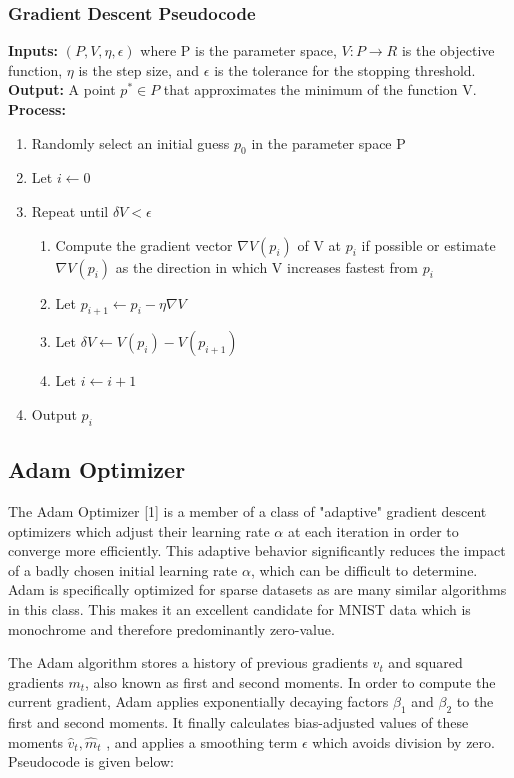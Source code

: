 \documentclass[10pt,twocolumn]{article}
\begin{document}
\subsubsection{Gradient Descent Pseudocode}

\textbf{Inputs:} $(P,V,\eta,\epsilon)$ where P is the parameter space, $V:P \rightarrow R$ is the objective function, $\eta$ is the step size, and $\epsilon$ is the tolerance for the stopping threshold. \\
\textbf{Output:} A point $p^*\in P$ that approximates the minimum of the function V.\\
\textbf{Process:}\\
\begin{enumerate}
\item Randomly select an initial guess $p_{0}$ in the parameter space P
\item Let $i\leftarrow 0$
\item Repeat until $\delta{V} < \epsilon$
	\begin{enumerate}[label=(\alph*)]
	\item Compute the gradient vector $\nabla{V(p_i)}$ of V at $p_{i}$ if possible or estimate $\nabla{V(p_i)}$ as the direction in which V increases fastest from $p_{i}$
	\item Let $p_{i+1} \leftarrow p_{i} - \eta\nabla{V}$
	\item Let $\delta{V}\leftarrow V(p_i) - V(p_{i+1})$
	\item Let $i \leftarrow i+1$
	\end{enumerate}
\item Output $p_{i}$
\end{enumerate}

\subsection{Adam Optimizer}

The Adam Optimizer [1] is a member of a class of "adaptive" gradient descent optimizers which adjust their learning rate $\alpha$ at each iteration in order to converge more efficiently. This adaptive behavior significantly reduces the impact of a badly chosen initial learning rate $\alpha$, which can be difficult to determine. Adam is specifically optimized for sparse datasets as are many similar algorithms in this class. This makes it an excellent candidate for MNIST data which is monochrome and therefore predominantly zero-value. 

The Adam algorithm stores a history of previous gradients $v_t$ and squared gradients $m_t$, also known as first and second moments. In order to compute the current gradient, Adam applies exponentially decaying factors $ \beta_1$ and $\beta_2$ to the first and second moments. It finally calculates bias-adjusted values of these moments $\hat{v}_t , \hat{m}_t $ , and applies a smoothing term $\epsilon$ which avoids division by zero. Pseudocode is given below:
\end{document}
